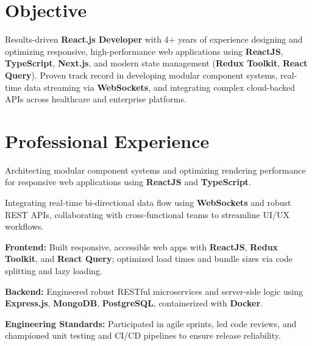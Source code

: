 \documentclass[]{deedy-resume}
\begin{document}
\begin{minipage}[t]{0.66\textwidth}

\section{Objective}
Results-driven \textbf{React.js Developer} with 4+ years of experience designing and optimizing responsive, high-performance web applications using \textbf{ReactJS}, \textbf{TypeScript}, \textbf{Next.js}, and modern state management (\textbf{Redux Toolkit}, \textbf{React Query}). Proven track record in developing modular component systems, real-time data streaming via \textbf{WebSockets}, and integrating complex cloud-backed APIs across healthcare and enterprise platforms.
\sectionsep

\section{Professional Experience}
\href{https://www.lyxa.ai/}{}
\vspace{\topsep}
\begin{tightemize}
\item Architecting modular component systems and optimizing rendering performance for responsive web applications using \textbf{ReactJS} and \textbf{TypeScript}.
\item Integrating real-time bi-directional data flow using \textbf{WebSockets} and robust REST APIs, collaborating with cross-functional teams to streamline UI/UX workflows.
\end{tightemize}
\sectionsep

\href{https://fluxit.tech/}{}
\vspace{\topsep}
\begin{tightemize}
\item \textbf{Frontend:} Built responsive, accessible web apps with \textbf{ReactJS}, \textbf{Redux Toolkit}, and \textbf{React Query}; optimized load times and bundle sizes via code splitting and lazy loading.
\item \textbf{Backend:} Engineered robust RESTful microservices and server-side logic using \textbf{Express.js}, \textbf{MongoDB}, \textbf{PostgreSQL}, containerized with \textbf{Docker}.
\item \textbf{Engineering Standards:} Participated in agile sprints, led code reviews, and championed unit testing and CI/CD pipelines to ensure release reliability.
\end{tightemize}
\sectionsep


\end{minipage}
\end{document}
